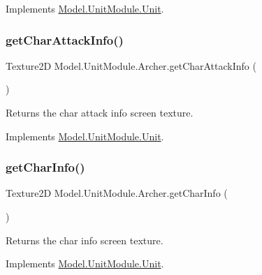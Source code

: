 Implements \hyperlink{interface_model_1_1_unit_module_1_1_unit_a6e9528d09bca7702fe99cc95135ede36}{Model.\+Unit\+Module.\+Unit}.

\hypertarget{class_model_1_1_unit_module_1_1_archer_aafb7e46f581d1710a16d054dfef03ddf}{}\label{class_model_1_1_unit_module_1_1_archer_aafb7e46f581d1710a16d054dfef03ddf} 
\subsubsection{\texorpdfstring{get\+Char\+Attack\+Info()}{getCharAttackInfo()}}
{\footnotesize\ttfamily Texture2D Model.\+Unit\+Module.\+Archer.\+get\+Char\+Attack\+Info (\begin{DoxyParamCaption}{ }\end{DoxyParamCaption})\hspace{0.3cm}{\ttfamily [inline]}}

Returns the char attack info screen texture. 

Implements \hyperlink{interface_model_1_1_unit_module_1_1_unit_a7c89d9a1dc648b556b7e57cdcdbf2930}{Model.\+Unit\+Module.\+Unit}.

\hypertarget{class_model_1_1_unit_module_1_1_archer_acfcb3e900ee60c0bd9ed800efc9abcac}{}\label{class_model_1_1_unit_module_1_1_archer_acfcb3e900ee60c0bd9ed800efc9abcac} 
\subsubsection{\texorpdfstring{get\+Char\+Info()}{getCharInfo()}}
{\footnotesize\ttfamily Texture2D Model.\+Unit\+Module.\+Archer.\+get\+Char\+Info (\begin{DoxyParamCaption}{ }\end{DoxyParamCaption})\hspace{0.3cm}{\ttfamily [inline]}}

Returns the char info screen texture. 

Implements \hyperlink{interface_model_1_1_unit_module_1_1_unit_a4e2aeae552d85c8938e609729bcd1a44}{Model.\+Unit\+Module.\+Unit}.

